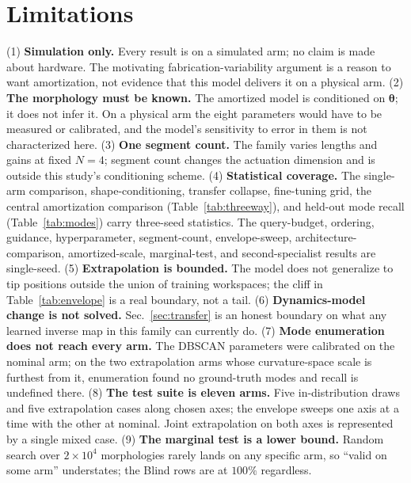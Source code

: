 \documentclass[robotics,article,submit,moreauthors]{Definitions/mdpi}
\begin{document}
\section{Limitations}
\label{sec:limitations}

(1) \textbf{Simulation only.} Every result is on a simulated arm; no claim
is made about hardware. The motivating fabrication-variability argument is
a reason to want amortization, not evidence that this model delivers it on
a physical arm. (2) \textbf{The morphology must be known.} The amortized
model is conditioned on $\boldsymbol{\theta}$; it does not infer it. On a
physical arm the eight parameters would have to be measured or calibrated,
and the model's sensitivity to error in them is not characterized here.
(3) \textbf{One segment count.} The family varies lengths and gains at
fixed $N{=}4$; segment count changes the actuation dimension and is
outside this study's conditioning scheme. (4) \textbf{Statistical
coverage.} The single-arm comparison, shape-conditioning, transfer
collapse, fine-tuning grid, the central amortization comparison
(Table~\ref{tab:threeway}), and held-out mode recall (Table~\ref{tab:modes})
carry three-seed statistics. The query-budget, ordering, guidance,
hyperparameter, segment-count, envelope-sweep, architecture-comparison,
amortized-scale, marginal-test, and second-specialist results are
single-seed. (5) \textbf{Extrapolation is bounded.} The model
does not generalize to tip positions outside the union of training
workspaces; the cliff in Table~\ref{tab:envelope} is a real boundary, not
a tail. (6) \textbf{Dynamics-model change is not solved.} Sec.~\ref{sec:transfer}
is an honest boundary on what any learned inverse map in this family can
currently do. (7) \textbf{Mode enumeration does not reach every arm.} The
DBSCAN parameters were calibrated on the nominal arm; on the two
extrapolation arms whose curvature-space scale is furthest from it,
enumeration found no ground-truth modes and recall is undefined there.
(8) \textbf{The test suite is eleven arms.} Five in-distribution draws and
five extrapolation cases along chosen axes; the envelope sweeps one axis at
a time with the other at nominal. Joint extrapolation on both axes is
represented by a single mixed case. (9) \textbf{The marginal test is a
lower bound.} Random search over $2\times10^4$ morphologies rarely lands on
any specific arm, so ``valid on some arm'' understates; the Blind rows are
at $100\%$ regardless.
\end{document}
